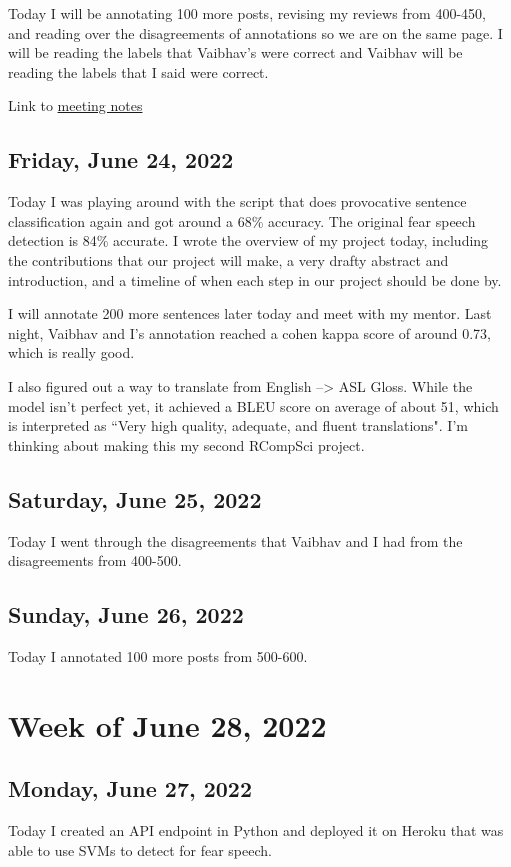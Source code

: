\documentclass[11pt,letterpaper]{article}
\begin{document}
Today I will be annotating 100 more posts, revising my reviews from 400-450, and reading over the disagreements of annotations so we are on the same page. I will be reading the labels that Vaibhav's were correct and Vaibhav will be reading the labels that I said were correct.

Link to \href{https://docs.google.com/document/d/1Bzm7CkOvRsMDzUCUNdFKpT2kQTxcEdSJR-o43tM2Jsg/edit?usp=sharing}{meeting notes}


\subsection{Friday, June 24, 2022}
Today I was playing around with the script that does provocative sentence classification again and got around a 68\% accuracy. The original fear speech detection is 84\% accurate. I wrote the overview of my project today, including the contributions that our project will make, a very drafty abstract and introduction, and a timeline of when each step in our project should be done by.

I will annotate 200 more sentences later today and meet with my mentor. Last night, Vaibhav and I's annotation reached a cohen kappa score of around 0.73, which is really good.


I also figured out a way to translate from English --> ASL Gloss. While the model isn't perfect yet, it achieved a BLEU score on average of about 51, which is interpreted as ``Very high quality, adequate, and fluent translations". I'm thinking about making this my second RCompSci project.

\subsection{Saturday, June 25, 2022}
Today I went through the disagreements that Vaibhav and I had from the disagreements from 400-500. 

\subsection{Sunday, June 26, 2022}
Today I annotated 100 more posts from 500-600.

\section{Week of June 28, 2022}
\subsection{Monday, June 27, 2022}
Today I created an API endpoint in Python and deployed it on Heroku that was able to use SVMs to detect for fear speech.
\end{document}
